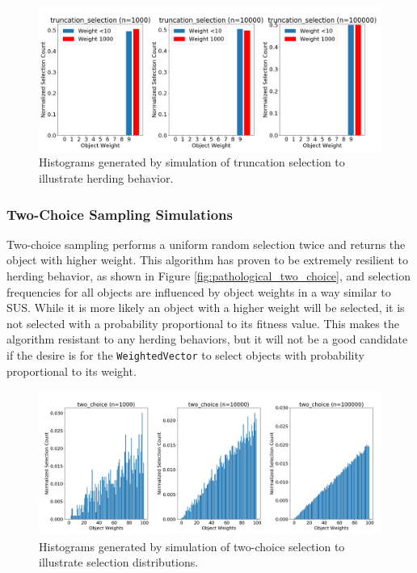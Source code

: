 \documentclass[12pt]{article}
\begin{document}
    \begin{figure}[htbp]
      \centering
      \includegraphics[scale=0.32]{images/pathological_truncation.png} 
      \caption{Histograms generated by simulation of truncation selection
               to illustrate herding behavior.}
      \label{fig:pathological_truncation}
    \end{figure}
    \FloatBarrier

    \subsubsection{Two-Choice Sampling Simulations}
    Two-choice sampling \cite{azar1994} \cite{2choice} performs a uniform
    random selection twice and returns the object with higher weight. This
    algorithm has proven to be extremely resilient to herding behavior, as shown
    in Figure \ref{fig:pathological_two_choice}, and selection frequencies for
    all objects are influenced by object weights in a way similar to SUS. While
    it is more likely an object with a higher weight will be selected, it is not
    selected with a probability proportional to its fitness value. This makes
    the algorithm resistant to any herding behaviors, but it will not be a good
    candidate if the desire is for the \texttt{WeightedVector} to select objects
    with probability proportional to its weight.

    \begin{figure}[htbp]
      \centering
      \includegraphics[scale=0.32]{images/herding_two_choice.png} 
      \caption{Histograms generated by simulation of two-choice selection
               to illustrate selection distributions.}
      \label{fig:herding_two_choice}
    \end{figure}
\end{document}
